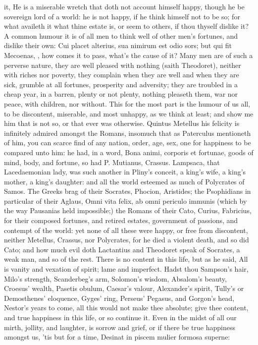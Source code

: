 {it, He is a miserable wretch that doth not account himself happy,
though he be sovereign lord of a world: he is not happy, if he think
himself not to be so; for what availeth it what thine estate is, or
seem to others, if thou thyself dislike it? A common humour it is of
all men to think well of other men's fortunes, and dislike their own:
Cui placet alterius, sua nimirum est odio sors; but qui fit
Mecoenas, \etc{}, how comes it to pass, what's the cause of it? Many men
are of such a perverse nature, they are well pleased with nothing
(saith Theodoret), neither with riches nor poverty, they
complain when they are well and when they are sick, grumble at all
fortunes, prosperity and adversity; they are troubled in a cheap year,
in a barren, plenty or not plenty, nothing pleaseth them, war nor
peace, with children, nor without. This for the most part is the humour
of us all, to be discontent, miserable, and most unhappy, as we think
at least; and show me him that is not so, or that ever was otherwise.
Quintus Metellus his felicity is infinitely admired amongst the Romans,
insomuch that as Paterculus mentioneth of him, you can scarce
find of any nation, order, age, sex, one for happiness to be compared
unto him: he had, in a word, Bona animi, corporis et fortunae, goods of
mind, body, and fortune, so had P. Mutianus, Crassus. Lampsaca,
that Lacedaemonian lady, was such another in Pliny's conceit, a
king's wife, a king's mother, a king's daughter: and all the world
esteemed as much of Polycrates of Samos. The Greeks brag of their
Socrates, Phocion, Aristides; the Psophidians in particular of their
Aglaus, Omni vita felix, ab omni periculo immunis (which by the way
Pausanias held impossible;) the Romans of their  Cato, Curius,
Fabricius, for their composed fortunes, and retired estates, government
of passions, and contempt of the world: yet none of all these were
happy, or free from discontent, neither Metellus, Crassus, nor
Polycrates, for he died a violent death, and so did Cato; and how much
evil doth Lactantius and Theodoret speak of Socrates, a weak man, and
so of the rest. There is no content in this life, but as he said,
All is vanity and vexation of spirit; lame and imperfect. Hadst thou
Sampson's hair, Milo's strength, Scanderbeg's arm, Solomon's wisdom,
Absalom's beauty, Croesus' wealth, Pasetis obulum, Caesar's valour,
Alexander's spirit, Tully's or Demosthenes' eloquence, Gyges' ring,
Perseus' Pegasus, and Gorgon's head, Nestor's years to come, all this
would not make thee absolute; give thee content, and true happiness in
this life, or so continue it. Even in the midst of all our mirth,
jollity, and laughter, is sorrow and grief, or if there be true
happiness amongst us, 'tis but for a time,
Desinat in piscem mulier formosa superne:

}
